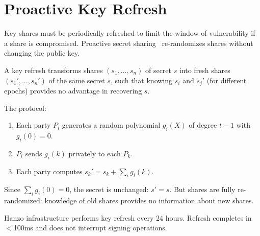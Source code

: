 \section{Proactive Key Refresh}

\label{sec:refresh}

Key shares must be periodically refreshed to limit the window of vulnerability
if a share is compromised. Proactive secret sharing~\cite{herzberg1995}
re-randomizes shares without changing the public key.

\begin{definition}
A key refresh transforms shares $(s_1, \ldots, s_n)$ of secret $s$ into fresh
shares $(s_1', \ldots, s_n')$ of the same secret $s$, such that knowing $s_i$
and $s_j'$ (for different epochs) provides no advantage in recovering $s$.
\end{definition}

The protocol:
\begin{enumerate}[leftmargin=1.4em]
    \item Each party $P_i$ generates a random polynomial $g_i(X)$ of degree
    $t-1$ with $g_i(0) = 0$.
    \item $P_i$ sends $g_i(k)$ privately to each $P_k$.
    \item Each party computes $s_k' = s_k + \sum_i g_i(k)$.
\end{enumerate}

Since $\sum_i g_i(0) = 0$, the secret is unchanged: $s' = s$. But shares are
fully re-randomized: knowledge of old shares provides no information about new
shares.

Hanzo infrastructure performs key refresh every 24 hours. Refresh completes in
$<$100ms and does not interrupt signing operations.


